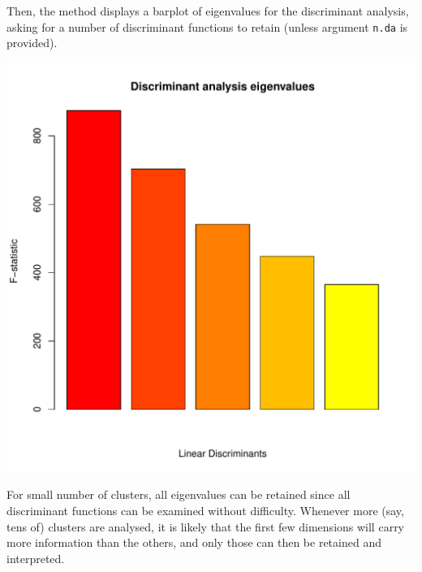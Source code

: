 \documentclass{article}
\begin{document}
Then, the method displays a barplot of eigenvalues for the discriminant analysis, asking for a
number of discriminant functions to retain (unless argument \texttt{n.da} is provided).
\begin{center}
  \includegraphics[width=.7\textwidth]{figs/eigen-dapc.pdf}
\end{center}

For small number of clusters, all eigenvalues can be retained since all discriminant functions can
be examined without difficulty. Whenever more (say, tens of) clusters are analysed,
it is likely that the first few dimensions will carry more information than the others, and only
those can then be retained and interpreted.
\\
\end{document}
